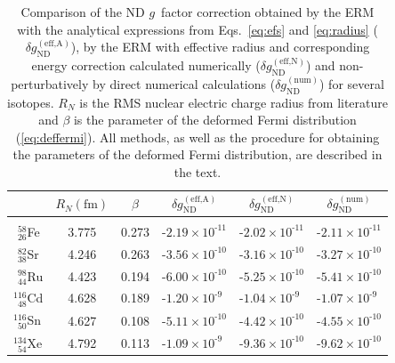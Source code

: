 \begin{table}[b]
\caption{\label{tab:spline}%
Comparison of the ND $g$~factor correction obtained by the ERM with the analytical expressions from Eqs.~\eqref{eq:efs} and \eqref{eq:radius} ($\delta g_{\text{ND}}^{(\text{eff,A})}$), by the ERM with effective radius and corresponding energy correction calculated numerically ($\delta g_{\text{ND}}^{(\text{eff,N})}$) and non-perturbatively by direct numerical calculations ($\delta g_{\text{ND}}^{(\text{num})}$) for several isotopes. $R_N$ is the RMS nuclear electric charge radius from literature \cite{Angeli2013} and $\beta$ is the parameter of the deformed Fermi distribution (\ref{eq:deffermi}). All methods, as well as the procedure for obtaining the parameters of the deformed Fermi distribution, are described in the text.
}
\begin{tabular}{lccccc}
 &$R{\scriptstyle _N(\text{fm})}$& $\beta$ & $\delta g_{\text{ND}}^{(\text{eff,A})}$ & $\delta g_{\text{ND}}^{(\text{eff,N})}$ & $\delta g_{\text{ND}}^{(\text{num})}$\\
\hline\\[-5pt]
$^{\phantom{0}58}_{\phantom{0}26}$Fe & 3.775 & 0.273 & ${\text{-}}{2.19}{\scriptstyle\times}{10^{\text{-}11}}$ &${\text{-}}{2.02}{\scriptstyle\times}{10^{\text{-}11}}$&${\text{-}}{2.11}{\scriptstyle\times}{10^{\text{-}11}}$\\[4pt]
$^{\phantom{0}82}_{\phantom{0}38}$Sr & 4.246 & 0.263 & ${\text{-}}{3.56}{\scriptstyle\times}{10^{\text{-}10}}$ &${\text{-}}{3.16}{\scriptstyle\times}{10^{\text{-}10}}$&${\text{-}}{3.27}{\scriptstyle\times}{10^{\text{-}10}}$\\[4pt]
$^{\phantom{0}98}_{\phantom{0}44}$Ru & 4.423 & 0.194 & ${\text{-}}{6.00}{\scriptstyle\times}{10^{\text{-}10}}$ &${\text{-}}{5.25}{\scriptstyle\times}{10^{\text{-}10}}$&${\text{-}}{5.41}{\scriptstyle\times}{10^{\text{-}10}}$\\[4pt]
$^{116}_{\phantom{0}48}$Cd           & 4.628 & 0.189 & ${\text{-}}{1.20}{\scriptstyle\times}{10^{\text{-}9\phantom{0}}}$ &${\text{-}}{1.04}{\scriptstyle\times}{10^{\text{-}9\phantom{0}}}$&${\text{-}}{1.07}{\scriptstyle\times}{10^{\text{-}9\phantom{0}}}$\\[4pt]
$^{116}_{\phantom{0}50}$Sn           & 4.627 & 0.108 & ${\text{-}}{5.11}{\scriptstyle\times}{10^{\text{-}10}}$ &${\text{-}}{4.42}{\scriptstyle\times}{10^{\text{-}10}}$&${\text{-}}{4.55}{\scriptstyle\times}{10^{\text{-}10}}$\\[4pt]
$^{134}_{\phantom{0}54}$Xe           & 4.792 & 0.113 & ${\text{-}}{1.09}{\scriptstyle\times}{10^{\text{-}9\phantom{0}}}$ &${\text{-}}{9.36}{\scriptstyle\times}{10^{\text{-}10}}$&${\text{-}}{9.62}{\scriptstyle\times}{10^{\text{-}10}}$\\[4pt]

\end{tabular}
\end{table}
